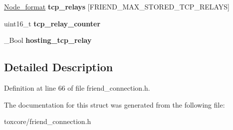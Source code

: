 \begin{DoxyCompactItemize}
\item 
\hypertarget{struct_friend___conn_ae6c286282d15bfd5ceea7c2d8b19be5d}{\hyperlink{struct_node__format}{Node\+\_\+format} {\bfseries tcp\+\_\+relays} \mbox{[}F\+R\+I\+E\+N\+D\+\_\+\+M\+A\+X\+\_\+\+S\+T\+O\+R\+E\+D\+\_\+\+T\+C\+P\+\_\+\+R\+E\+L\+A\+Y\+S\mbox{]}}\label{struct_friend___conn_ae6c286282d15bfd5ceea7c2d8b19be5d}

\item 
\hypertarget{struct_friend___conn_aff5cc62447994133f0b5b15e11aa92ed}{uint16\+\_\+t {\bfseries tcp\+\_\+relay\+\_\+counter}}\label{struct_friend___conn_aff5cc62447994133f0b5b15e11aa92ed}

\item 
\hypertarget{struct_friend___conn_a4865ba9009fdee84e62a08fb92a59ab5}{\+\_\+\+Bool {\bfseries hosting\+\_\+tcp\+\_\+relay}}\label{struct_friend___conn_a4865ba9009fdee84e62a08fb92a59ab5}

\end{DoxyCompactItemize}


\subsection{Detailed Description}


Definition at line 66 of file friend\+\_\+connection.\+h.



The documentation for this struct was generated from the following file\+:\begin{DoxyCompactItemize}
\item 
toxcore/friend\+\_\+connection.\+h\end{DoxyCompactItemize}
